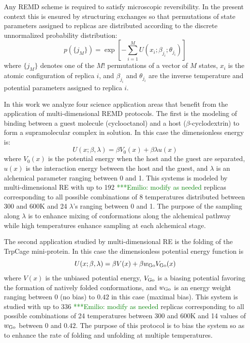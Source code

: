 \documentclass{sig-alternate}
\newcommand{\egnote}[1]{ {\textcolor{green} { ***Emilio: #1 }}}
\newcommand{\egnote}[1]{ {}}
\begin{document}
Any REMD scheme is required to satisfy microscopic reversibility. In the 
present context this is ensured by structuring exchanges so that permutations 
of state parameters assigned to replicas are distributed according to the 
discrete unnormalized probability distribution:\cite{chodera2011replica}
\begin{equation}
p(\{j_M\})=\exp\left[-\sum_{i=1}^M U(x_i;\beta_{j_i};\theta_{j_i})\right] \,
\end{equation}
where $\{j_M\}$ denotes one of the $M!$ permutations of a vector of $M$ states,
$x_i$ is the atomic configuration of replica $i$, and $\beta_{j_i}$ and 
$\theta_{j_i}$ are the inverse temperature and potential parameters assigned to
replica $i$.

In this work we analyze four science application areas that benefit from the 
application of multi-dimensional REMD protocols. The first is the modeling of 
binding between a guest molecule (cyclooctanol) and a host 
($\beta$-cyclodextrin) to form a supramolecular complex in solution.\cite{Gallicchio2012a} In this case the dimensionless energy is:\cite{Gallicchio2010}
\begin{equation}
U(x;\beta,\lambda) = \beta V_0(x) + \beta \lambda u(x) \,
\end{equation}
where $V_0(x)$ is the potential energy when the host and the guest are 
separated, $u(x)$ is the interaction energy between the host and the guest, and
$\lambda$ is an alchemical parameter ranging between 0 and 1. This systems is 
modeled by multi-dimensional RE with up to 192 \egnote{modify as needed} 
replicas corresponding to all possible combinations of 8 temperatures 
distributed between 300 and 600K and 24 $\lambda$'s ranging between 0 and 1. 
The purpose of the sampling along $\lambda$ is to enhance mixing of 
conformations along the alchemical pathway while high temperatures enhance 
sampling at each alchemical stage.

The second application studied by multi-dimensional RE is the folding of the 
TrpCage mini-protein. In this case the dimensionless potential energy function 
is
\begin{equation}
U(x;\beta,\lambda) = \beta V(x) + \beta w_{\rm Go} V_{\rm Go}(x) \,
\end{equation}
where $V(x)$ is the unbiased potential energy, $V_{\rm Go}$ is a biasing 
potential favoring the formation of natively folded conformations,\cite{pogorelov2004variations} and 
$w_{\rm Go}$ is an energy weight ranging between 0 (no bias) to $0.42$ in this 
case (maximal bias). This system is studied with up to 336 \egnote{modify as 
  needed} replicas corresponding to all possible combinations of 24 
temperatures between 300 and 600K and 14 values of  $w_{\rm Go}$ between 0 and 
$0.42$. The purpose of this protocol is to bias the system so as to enhance the
rate of folding and unfolding at multiple temperatures.
\end{document}
